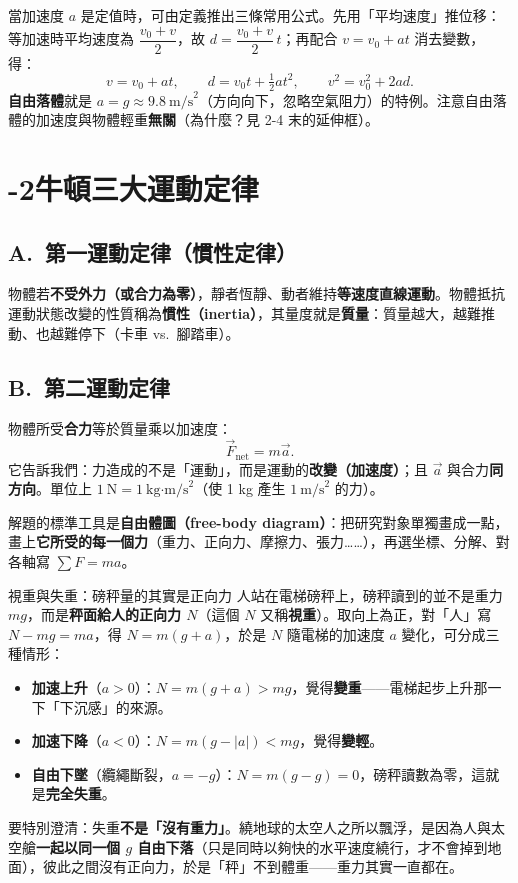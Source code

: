 \documentclass[11pt]{article}
\begin{document}
當加速度 $a$ 是定值時，可由定義推出三條常用公式。先用「平均速度」推位移：等加速時平均速度為 $\dfrac{v_0+v}{2}$，故 $d=\dfrac{v_0+v}{2}\,t$；再配合 $v=v_0+at$ 消去變數，得：
$$v = v_0 + at,\qquad d = v_0 t + \tfrac{1}{2}at^2,\qquad v^2 = v_0^2 + 2ad.$$
\textbf{自由落體}就是 $a=g\approx 9.8\ \text{m/s}^2$（方向向下，忽略空氣阻力）的特例。注意自由落體的加速度與物體輕重\textbf{無關}（為什麼？見 2-4 末的延伸框）。

\section*{-2\quad 牛頓三大運動定律}

\subsection*{\sffamily A.\ 第一運動定律（慣性定律）}

物體若\textbf{不受外力（或合力為零）}，靜者恆靜、動者維持\textbf{等速度直線運動}。物體抵抗運動狀態改變的性質稱為\textbf{慣性（inertia）}，其量度就是\textbf{質量}：質量越大，越難推動、也越難停下（卡車 vs.\ 腳踏車）。

\subsection*{\sffamily B.\ 第二運動定律}

物體所受\textbf{合力}等於質量乘以加速度：
$$\vec{F}_{\text{net}} = m\vec{a}.$$
它告訴我們：力造成的不是「運動」，而是運動的\textbf{改變（加速度）}；且 $\vec{a}$ 與合力\textbf{同方向}。單位上 $1\ \text{N} = 1\ \text{kg·m/s}^2$（使 1 kg 產生 $1\ \text{m/s}^2$ 的力）。

解題的標準工具是\textbf{自由體圖（free-body diagram）}：把研究對象單獨畫成一點，畫上\textbf{它所受的每一個力}（重力、正向力、摩擦力、張力……），再選坐標、分解、對各軸寫 $\sum F = ma$。


\begin{補充框}{視重與失重：磅秤量的其實是正向力}
人站在電梯磅秤上，磅秤讀到的並不是重力 $mg$，而是\textbf{秤面給人的正向力 $N$}（這個 $N$ 又稱\textbf{視重}）。取向上為正，對「人」寫 $N-mg=ma$，得 $N=m(g+a)$，於是 $N$ 隨電梯的加速度 $a$ 變化，可分成三種情形：

\begin{itemize}\setlength{\itemsep}{1pt}
\item \textbf{加速上升}（$a>0$）：$N=m(g+a)>mg$，覺得\textbf{變重}——電梯起步上升那一下「下沉感」的來源。
\item \textbf{加速下降}（$a<0$）：$N=m(g-|a|)<mg$，覺得\textbf{變輕}。
\item \textbf{自由下墜}（纜繩斷裂，$a=-g$）：$N=m(g-g)=0$，磅秤讀數為零，這就是\textbf{完全失重}。
\end{itemize}

要特別澄清：失重\textbf{不是「沒有重力」}。繞地球的太空人之所以飄浮，是因為人與太空艙\textbf{一起以同一個 $g$ 自由下落}（只是同時以夠快的水平速度繞行，才不會掉到地面），彼此之間沒有正向力，於是「秤」不到體重——重力其實一直都在。
\end{補充框}
\end{document}

